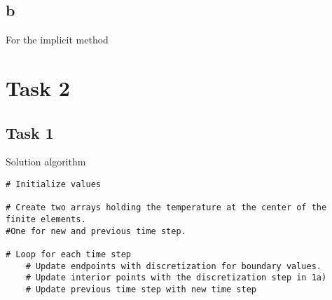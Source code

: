 \documentclass{article}
\begin{document}
\subsection*{b}

For the implicit method

\section*{Task 2}

\subsection*{Task 1}

Solution algorithm

\begin{lstlisting}
# Initialize values

# Create two arrays holding the temperature at the center of the finite elements. 
#One for new and previous time step.

# Loop for each time step
	# Update endpoints with discretization for boundary values.
	# Update interior points with the discretization step in 1a)
	# Update previous time step with new time step
\end{lstlisting}
\end{document}

